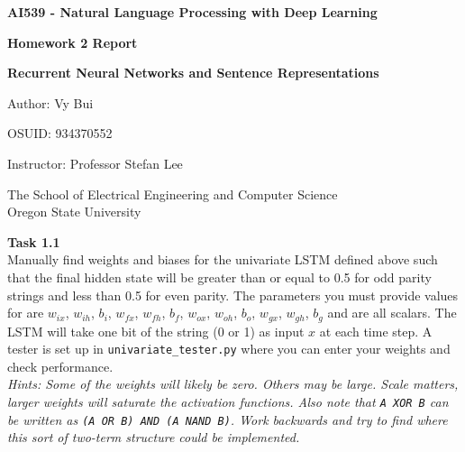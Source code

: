 \documentclass[12pt,article]{article}
\newenvironment{task}[2][Task]
    { \begin{mdframed}[backgroundcolor=gray!20] \textbf{#1 #2} \\}
    {  \end{mdframed}}
\begin{document}
\begin{titlepage}
    \begin{center}
        \vspace*{4cm}

        \textbf{\Large AI539 - Natural Language Processing with Deep Learning}

        \vspace{0.5cm}
 
        \textbf{ Homework 2 Report}

        \textbf{ Recurrent Neural Networks and Sentence Representations }
 
        \vspace{1cm}

        Author: Vy Bui

        OSUID: 934370552

        \vspace{1cm}

        Instructor: Professor Stefan Lee
        \vfill
             
        \vspace{0.8cm}
      
             
        The School of Electrical Engineering and Computer Science\\
        Oregon State University\\
             
    \end{center}
\end{titlepage}


\newpage
\begin{task}{1.1} 
Manually find weights and biases for the univariate LSTM defined above such that the final hidden state will be greater than or equal to 0.5 for odd parity strings and less than 0.5 for even parity. The parameters you must provide values for are $w_{ix}$, $w_{ih}$, $b_i$, $w_{fx}$, $w_{fh}$, $b_f$, $w_{ox}$, $w_{oh}$, $b_o$, $w_{gx}$, $w_{gh}$, $b_g$ and are all scalars. The LSTM will take one bit of the string (0 or 1) as input $x$ at each time step. A tester is set up in \texttt{univariate\_tester.py} where you can enter your weights and check performance. \\[5pt]

\emph{Hints: Some of the weights will likely be zero. Others may be large. Scale matters, larger weights will saturate the activation functions. Also note that \texttt{A XOR B} can be written as \texttt{(A OR B) AND (A NAND B)}. Work backwards and try to find where this sort of two-term structure could be implemented.} 
\end{task}
\end{document}
